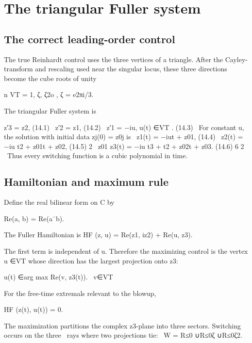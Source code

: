 \chapter{The triangular Fuller system}
\section{The correct leading-order control}

The true Reinhardt control uses the three vertices of a triangle. After the Cayley-transform and rescaling used near the singular locus, these three directions become the cube roots of unity


\begin{displaytext}
n VT = 1, ζ, ζ2o , ζ = e2πi/3.
\end{displaytext}

The triangular Fuller system is


\begin{displaytext}
z′3 = z2, (14.1) \
z′2 = z1, (14.2) \
z′1 = −iu, u(t) ∈VT . (14.3) \
For constant u, the solution with initial data zj(0) = z0j is \
z1(t) = −iut + z01, (14.4) \
z2(t) = −iu t2 + z01t + z02, (14.5) 2 \
z01 z3(t) = −iu t3 + t2 + z02t + z03. (14.6) 6 2 \
Thus every switching function is a cubic polynomial in time.
\end{displaytext}

\section{Hamiltonian and maximum rule}

Define the real bilinear form on C by


Re(a, b) = Re(a¯b).


The Fuller Hamiltonian is HF (z, u) = Re(z1, iz2) + Re(u, z3).


The first term is independent of u. Therefore the maximizing control is the vertex u ∈VT whose direction has the largest projection onto z3:


\begin{displaytext}
u(t) ∈arg max Re(v, z3(t)). \
v∈VT
\end{displaytext}

For the free-time extremals relevant to the blowup,


HF (z(t), u(t)) = 0.


\begin{displaytext}
The maximization partitions the complex z3-plane into three sectors. Switching occurs on the three \
rays where two projections tie: \
W = R≤0 ∪R≤0ζ ∪R≤0ζ2.
\end{displaytext}

